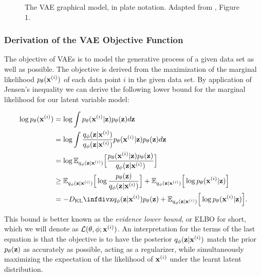 \begin{figure}[!htb]
  \centering
  \resizebox{0.3\textwidth}{!}{\unskip}
  \caption{The VAE graphical model, in plate notation. Adapted from \cite{aevb}, Figure 1.}
  \label{fig:aevb_plate_notation}
\end{figure}

\subsubsection{Derivation of the VAE Objective Function}


The objective of VAEs is to model the generative process of a given data set as well as possible. The objective is derived from the maximization of the marginal likelihood $p_{\mathbf{\theta}}(\mathbf{x}^{(i)})$ of each data point $i$ in the given data set. By application of Jensen's inequality we can derive the following lower bound for the marginal likelihood for our latent variable model:

\begin{equation}
\begin{aligned}
\log \ptheta(\bxi) & = \log \int \ptheta(\bxi \vert \bz) \ptheta(\bz) d\bz \\
                   & = \log \int \frac{\qphi(\bz \vert \bxi)}{\qphi(\bz \vert \bxi)} \ptheta(\bxi \vert \bz) \ptheta(\bz) d\bz \\
                   & = \log \mathbb{E}_{\qphi(\bz \vert \bxi)}\Big[\frac{\ptheta(\bxi \vert \bz) \ptheta(\bz)}{\qphi(\bz \vert \bxi)}\Big] \\
                   & \geq \mathbb{E}_{\qphi(\bz \vert \bxi)}\Big[\log \frac{\ptheta(\bz)}{\qphi(\bz \vert \bxi)}\Big] + \mathbb{E}_{\qphi(\bz \vert \bxi)}\Big[\log \ptheta(\bxi \vert \bz)\Big] \\
                   & = -\dkl{\qphi(\bz \vert \bxi)}{\ptheta(\bz)} + \mathbb{E}_{\qphi(\bz \vert \bxi)}\Big[\log \ptheta(\bxi \vert \bz)\Big].
\end{aligned}
\end{equation}

This bound is better known as the \textit{evidence lower bound}, or ELBO for short, which we will denote as $\mathcal{L}(\mathbf{\theta}, \mathbf{\phi}; \mathbf{x}^{(i)})$. An interpretation for the terms of the last equation is that the objective is to have the posterior $q_{\mathbf{\phi}}(\mathbf{z} \vert \mathbf{x}^{(i)})$ match the prior $p_{\mathbf{\theta}}(\mathbf{z})$ as accurately as possible, acting as a regularizer, while simultaneously maximizing the expectation of the likelihood of $\mathbf{x}^{(i)}$ under the learnt latent distribution. 

